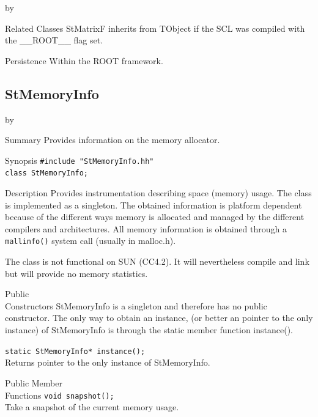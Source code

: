\documentclass[twoside]{article}
\newcommand{\name}[1]{\textsf{#1}}%
\newcommand{\comp}[1]{\texttt{#1}}%
\newcommand{\entrylabel}[1]{\mbox{\textbf{{#1}}}\hfil}%
\newenvironment{entry}
{\begin{list}{}%
    {\renewcommand{\makelabel}{\entrylabel}%
     \setlength{\labelwidth}{90pt}%
     \setlength{\leftmargin}{\labelwidth}
     \advance\leftmargin by \labelsep%
      }%
    }%
  {\end{list}}
\newcommand{\Entrylabel}[1]%
{\raisebox{0pt}[1ex][0pt]{\makebox[\labelwidth][l]%
    {\parbox[t]{\labelwidth}{\hspace{0pt}\textbf{{#1}}}}}}
\newenvironment{Entry}%
{\renewcommand{\entrylabel}{\Entrylabel}\begin{entry}}%
  {\end{entry}}
\begin{document}
\begin{description}
\begin{Entry}
\item[Related Classes]
    StMatrixF inherits from TObject 
    if the SCL was compiled with the \name{\_\_ROOT\_\_} flag set.

\item[Persistence]
    Within the ROOT framework.

\end{Entry}

%
%
\subsection{StMemoryInfo}
\label{StMemoryInfo}
\begin{Entry}
\item[Summary]
    Provides information on the memory allocator.

\item[Synopsis]
    \verb+#include "StMemoryInfo.hh"+\\
    \verb+class StMemoryInfo;+
    
\item[Description]   
    Provides instrumentation describing space (memory) usage.
    The class is implemented as a singleton. The obtained information
    is platform dependent because of the different ways memory is
    allocated and managed by the different compilers and architectures.
    All memory information is obtained through a \comp{mallinfo()} system
    call (usually in malloc.h). 
    
    The class is not functional on SUN (CC4.2). It will nevertheless
    compile and link but will provide no memory statistics.
        
\item[Public\\ Constructors]
    StMemoryInfo is a singleton and therefore has no
    public constructor. The only way to obtain an instance,
    (or better an pointer to the only instance)
    of StMemoryInfo is through the static member function
    instance().

    \verb+static StMemoryInfo* instance();+\\
    Returns pointer to the only instance of StMemoryInfo.
    
\item[Public Member\\ Functions]
    \verb+void snapshot();+\\
    Take a snapshot of the current memory usage.
    

\end{Entry}
\end{description}
\end{document}

